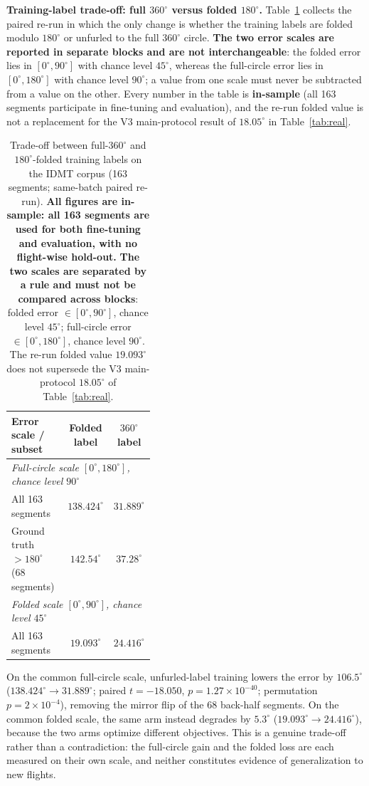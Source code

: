 \documentclass[5p,twocolumn]{elsarticle}
\begin{document}
\textbf{Training-label trade-off: full $360^\circ$ versus folded $180^\circ$.} Table~\ref{tab:label_tradeoff} collects the paired re-run in which the only change is whether the training labels are folded modulo $180^\circ$ or unfurled to the full $360^\circ$ circle. \textbf{The two error scales are reported in separate blocks and are not interchangeable}: the folded error lies in $[0^\circ,90^\circ]$ with chance level $45^\circ$, whereas the full-circle error lies in $[0^\circ,180^\circ]$ with chance level $90^\circ$; a value from one scale must never be subtracted from a value on the other. Every number in the table is \textbf{in-sample} (all 163 segments participate in fine-tuning and evaluation), and the re-run folded value is not a replacement for the V3 main-protocol result of $18.05^\circ$ in Table~\ref{tab:real}.

\begin{table}[t]
\renewcommand{\arraystretch}{1.2}
\centering
\caption{Trade-off between full-$360^\circ$ and $180^\circ$-folded training labels on the IDMT corpus (163 segments; same-batch paired re-run). \textbf{All figures are in-sample: all 163 segments are used for both fine-tuning and evaluation, with no flight-wise hold-out.} \textbf{The two scales are separated by a rule and must not be compared across blocks}: folded error $\in[0^\circ,90^\circ]$, chance level $45^\circ$; full-circle error $\in[0^\circ,180^\circ]$, chance level $90^\circ$. The re-run folded value $19.093^\circ$ does not supersede the V3 main-protocol $18.05^\circ$ of Table~\ref{tab:real}.}
\label{tab:label_tradeoff}
\small
\setlength{\tabcolsep}{4pt}
\begin{tabular}{p{0.40\linewidth}cc}
\toprule
Error scale / subset & Folded label & $360^\circ$ label \\
\midrule
\multicolumn{3}{l}{\textit{Full-circle scale $[0^\circ,180^\circ]$, chance level $90^\circ$}} \\
All 163 segments & $138.424^\circ$ & $31.889^\circ$ \\
Ground truth $>180^\circ$ (68 segments) & $142.54^\circ$ & $37.28^\circ$ \\
\midrule
\multicolumn{3}{l}{\textit{Folded scale $[0^\circ,90^\circ]$, chance level $45^\circ$}} \\
All 163 segments & $19.093^\circ$ & $24.416^\circ$ \\
\bottomrule
\end{tabular}
\end{table}

On the common full-circle scale, unfurled-label training lowers the error by $106.5^\circ$ ($138.424^\circ\to31.889^\circ$; paired $t=-18.050$, $p=1.27\times10^{-40}$; permutation $p=2\times10^{-4}$), removing the mirror flip of the 68 back-half segments. On the common folded scale, the same arm instead degrades by $5.3^\circ$ ($19.093^\circ\to24.416^\circ$), because the two arms optimize different objectives. This is a genuine trade-off rather than a contradiction: the full-circle gain and the folded loss are each measured on their own scale, and neither constitutes evidence of generalization to new flights.
\end{document}
